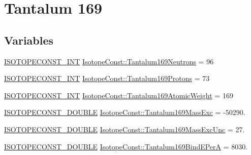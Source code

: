 \hypertarget{group___isotope_const-_tantalum-_ta169}{}\section{Tantalum 169}
\label{group___isotope_const-_tantalum-_ta169}
\subsection*{Variables}
\begin{DoxyCompactItemize}
\item 
\mbox{\hyperlink{group___isotope_const-_macros_ga5f18360b3e99483a35c32d789e62621c}{I\+S\+O\+T\+O\+P\+E\+C\+O\+N\+S\+T\+\_\+\+I\+NT}} \mbox{\hyperlink{group___isotope_const-_tantalum-_ta169_gaae308a77cb96c54855d61d99bdbabcdd}{Isotope\+Const\+::\+Tantalum169\+Neutrons}} = 96
\item 
\mbox{\hyperlink{group___isotope_const-_macros_ga5f18360b3e99483a35c32d789e62621c}{I\+S\+O\+T\+O\+P\+E\+C\+O\+N\+S\+T\+\_\+\+I\+NT}} \mbox{\hyperlink{group___isotope_const-_tantalum-_ta169_ga179c4e0c53045b8a78471c74c126e377}{Isotope\+Const\+::\+Tantalum169\+Protons}} = 73
\item 
\mbox{\hyperlink{group___isotope_const-_macros_ga5f18360b3e99483a35c32d789e62621c}{I\+S\+O\+T\+O\+P\+E\+C\+O\+N\+S\+T\+\_\+\+I\+NT}} \mbox{\hyperlink{group___isotope_const-_tantalum-_ta169_ga9d1465866b3a032990a5a1b03786e790}{Isotope\+Const\+::\+Tantalum169\+Atomic\+Weight}} = 169
\item 
\mbox{\hyperlink{group___isotope_const-_macros_ga8f45a7272ce02c0b4c65c44636ed719a}{I\+S\+O\+T\+O\+P\+E\+C\+O\+N\+S\+T\+\_\+\+D\+O\+U\+B\+LE}} \mbox{\hyperlink{group___isotope_const-_tantalum-_ta169_gabb57e7d082e4b55a7856478135bd2e98}{Isotope\+Const\+::\+Tantalum169\+Mass\+Exc}} = -\/50290.
\item 
\mbox{\hyperlink{group___isotope_const-_macros_ga8f45a7272ce02c0b4c65c44636ed719a}{I\+S\+O\+T\+O\+P\+E\+C\+O\+N\+S\+T\+\_\+\+D\+O\+U\+B\+LE}} \mbox{\hyperlink{group___isotope_const-_tantalum-_ta169_gaa68f4626a06c5411b6ba7b1151c7585f}{Isotope\+Const\+::\+Tantalum169\+Mass\+Exc\+Unc}} = 27.
\item 
\mbox{\hyperlink{group___isotope_const-_macros_ga8f45a7272ce02c0b4c65c44636ed719a}{I\+S\+O\+T\+O\+P\+E\+C\+O\+N\+S\+T\+\_\+\+D\+O\+U\+B\+LE}} \mbox{\hyperlink{group___isotope_const-_tantalum-_ta169_gab2054b1c7355a56060c422975b6abc81}{Isotope\+Const\+::\+Tantalum169\+Bind\+E\+PerA}} = 8030.
\item 

\end{DoxyCompactItemize}
